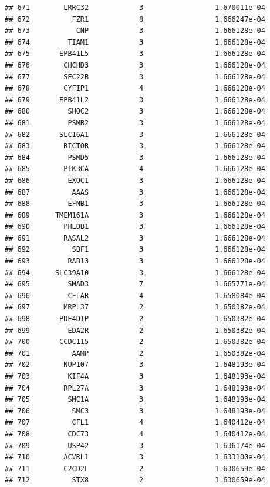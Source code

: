 \documentclass[
]{article}
\begin{document}
\begin{verbatim}
## 671        LRRC32            3                 1.670011e-04
## 672          FZR1            8                 1.666247e-04
## 673           CNP            3                 1.666128e-04
## 674         TIAM1            3                 1.666128e-04
## 675       EPB41L5            3                 1.666128e-04
## 676        CHCHD3            3                 1.666128e-04
## 677        SEC22B            3                 1.666128e-04
## 678        CYFIP1            4                 1.666128e-04
## 679       EPB41L2            3                 1.666128e-04
## 680         SHOC2            3                 1.666128e-04
## 681         PSMB2            3                 1.666128e-04
## 682       SLC16A1            3                 1.666128e-04
## 683        RICTOR            3                 1.666128e-04
## 684         PSMD5            3                 1.666128e-04
## 685        PIK3CA            4                 1.666128e-04
## 686         EXOC1            3                 1.666128e-04
## 687          AAAS            3                 1.666128e-04
## 688         EFNB1            3                 1.666128e-04
## 689      TMEM161A            3                 1.666128e-04
## 690        PHLDB1            3                 1.666128e-04
## 691        RASAL2            3                 1.666128e-04
## 692          SBF1            3                 1.666128e-04
## 693         RAB13            3                 1.666128e-04
## 694      SLC39A10            3                 1.666128e-04
## 695         SMAD3            7                 1.665771e-04
## 696         CFLAR            4                 1.658084e-04
## 697        MRPL37            2                 1.650382e-04
## 698       PDE4DIP            2                 1.650382e-04
## 699         EDA2R            2                 1.650382e-04
## 700       CCDC115            2                 1.650382e-04
## 701          AAMP            2                 1.650382e-04
## 702        NUP107            3                 1.648193e-04
## 703         KIF4A            3                 1.648193e-04
## 704        RPL27A            3                 1.648193e-04
## 705         SMC1A            3                 1.648193e-04
## 706          SMC3            3                 1.648193e-04
## 707          CFL1            4                 1.640412e-04
## 708         CDC73            4                 1.640412e-04
## 709         USP42            3                 1.636174e-04
## 710        ACVRL1            3                 1.633100e-04
## 711        C2CD2L            2                 1.630659e-04
## 712          STX8            2                 1.630659e-04

\end{verbatim}
\end{document}
